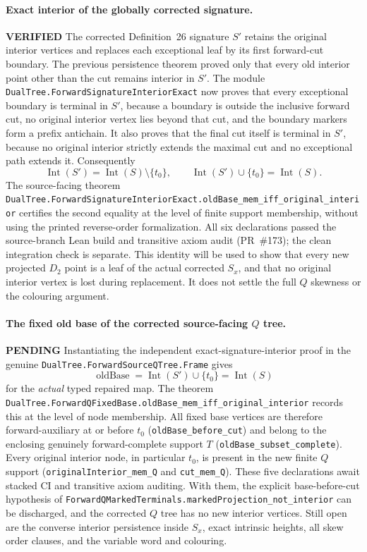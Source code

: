 \documentclass[11pt]{article}
\newcommand{\ok}{\textcolor{green!40!black}{\textbf{VERIFIED}}}
\newcommand{\todo}{\textcolor{gray!70!black}{\textbf{PENDING}}}
\newcommand{\lean}[1]{\texttt{#1}}
\begin{document}
\paragraph{Exact interior of the globally corrected signature.} \ok
The corrected Definition~26 signature $S'$ retains
the original interior vertices and replaces each
exceptional leaf by its first forward-cut boundary.
The previous persistence theorem proved only that
every old interior point other than the cut
remains interior in $S'$.
The module
\lean{DualTree.ForwardSignatureInteriorExact}
now proves that every exceptional boundary is
terminal in $S'$, because a boundary is outside
the inclusive forward cut, no original interior
vertex lies beyond that cut, and the boundary
markers form a prefix antichain.
It also proves that the final cut itself is
terminal in $S'$, because no original interior
strictly extends the maximal cut and no
exceptional path extends it.
Consequently
\[
 \operatorname{Int}(S')
 =\operatorname{Int}(S)\setminus\{t_0\},\qquad
 \operatorname{Int}(S')\cup\{t_0\}
 =\operatorname{Int}(S).
\]
The source-facing theorem
\lean{DualTree.ForwardSignatureInteriorExact.oldBase_mem_iff_original_interior}
certifies the second equality at the level
of finite support membership, without using
the printed reverse-order formalization.
All six declarations passed the source-branch Lean build and
transitive axiom audit (PR~\#173); the clean integration check is separate.
This identity will be used to show that every
new projected $D_2$ point is a leaf of the
actual corrected $S_x$, and that no original
interior vertex is lost during replacement.
It does not settle the full $Q$ skewness
or the colouring argument.

\paragraph{The fixed old base of the corrected source-facing $Q$ tree.} \todo
Instantiating the independent exact-signature-interior
proof in the genuine
\lean{DualTree.ForwardSourceQTree.Frame}
gives
\[
 \operatorname{oldBase}
 =\operatorname{Int}(S')\cup\{t_0\}
 =\operatorname{Int}(S)
\]
for the \emph{actual} typed repaired map.
The theorem
\lean{DualTree.ForwardQFixedBase.oldBase_mem_iff_original_interior}
records this at the level of node membership.
All fixed base vertices are therefore
forward-auxiliary at or before $t_0$
(\lean{oldBase_before_cut}) and belong to
the enclosing genuinely forward-complete
support $T$ (\lean{oldBase_subset_complete}).
Every original interior node, in particular
$t_0$, is present in the new finite
$Q$ support (\lean{originalInterior_mem_Q}
and \lean{cut_mem_Q}).
These five declarations await stacked CI
and transitive axiom auditing. With them,
the explicit base-before-cut hypothesis of
\lean{ForwardQMarkedTerminals.markedProjection_not_interior}
can be discharged, and the corrected
$Q$ tree has no new interior vertices.
Still open are the converse interior
persistence inside $S_x$, exact intrinsic
heights, all skew order clauses, and
the variable word and colouring.
\end{document}
